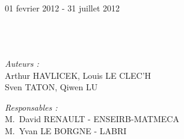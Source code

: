 \begin{titlepage}
\begin{center}
\begin{center}
\begin{tabular}{c c c}
      
      
      
    \end{tabular}
    
    
      
    \textsc{\Large \reportsubject}\\[0.5cm]
           {\large 01 fevrier 2012 - 31 juillet 2012}\\
           
           
           \HRule \\[0.4cm]
                  {\huge \bfseries \reporttitle}\\[0.4cm]
                  \HRule \\[1.5cm]
                  
                  \begin{center}
                    
                    \begin{flushleft} 
                      \large
                      \emph{Auteurs :}\\
                      
                      Arthur \textsc{HAVLICEK}, Louis \textsc{LE CLEC'H}\\ 
                      Sven \textsc{TATON}, Qiwen \textsc{LU}\\
                      
                    \end{flushleft}
                    
                    
                    \begin{flushright} 
                      \large
                      \emph{Responsables :} \\
                      M.~David \textsc{RENAULT - ENSEIRB-MATMECA} \\
                      M.~Yvan \textsc{LE BORGNE - LABRI}
                    \end{flushright}
                  \end{center}
                  
                  
                  
                  
                  
  \end{center}    
\end{center}
\end{titlepage}
